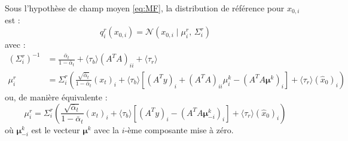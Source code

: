 \documentclass[12pt]{article}
\newcommand{\alt}{\bar\alpha_t}
\begin{document}
\begin{propositionbox}
\label{prop:qr_x0i}
Sous l'hypothèse de champ moyen \eqref{eq:MF}, la distribution de référence pour $x_{0,i}$ est :
\begin{equation}
    \boxed{q_i^r(x_{0,i}) = \mathcal{N}(x_{0,i} \mid \mu_i^r,\, \Sigma_i^r)}
\end{equation}
avec :
\begin{align}
    (\Sigma_i^r)^{-1} &= \frac{\alt}{1-\alt} + \langle\tau_b\rangle (A^T A)_{ii} + \langle\tau_r\rangle \label{eq:sigma_r_i}\\[6pt]
    \mu_i^r &= \Sigma_i^r \left(\frac{\sqrt{\alt}}{1-\alt}(x_t)_i + \langle\tau_b\rangle \left[(A^T y)_i + (A^T A)_{ii}\mu_i^k - (A^T A \boldsymbol{\mu}^k)_i\right] + \langle\tau_r\rangle (\hat{x}_0)_i\right) \label{eq:m_r_i}
\end{align}
ou, de manière équivalente :
\begin{equation}
    \mu_i^r = \Sigma_i^r \left(\frac{\sqrt{\alt}}{1-\alt}(x_t)_i + \langle\tau_b\rangle \left[(A^T y)_i - (A^T A \boldsymbol{\mu}^k_{-i})_i\right] + \langle\tau_r\rangle (\hat{x}_0)_i\right) \label{eq:m_r_i_alt}
\end{equation}
où $\boldsymbol{\mu}^k_{-i}$ est le vecteur $\boldsymbol{\mu}^k$ avec la $i$-ème composante mise à zéro.
\end{propositionbox}
\end{document}
